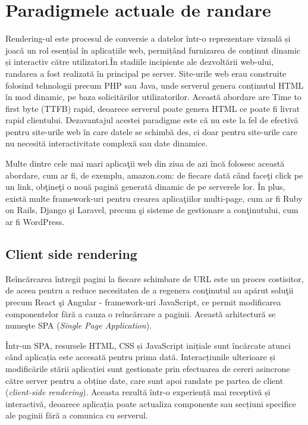 \documentclass[12pt, a4paper]{report}
\begin{document}
\chapter{Paradigmele actuale de randare}
Rendering-ul este procesul de conversie a datelor într-o reprezentare vizuală și joacă un rol esențial în aplicațiile web, permițând furnizarea de conținut dinamic și interactiv către utilizatori.În stadiile incipiente ale dezvoltării web-ului, randarea a fost realizată în principal pe server. Site-urile web erau construite folosind tehnologii precum PHP sau Java, unde serverul genera conținutul HTML în mod dinamic, pe baza solicitărilor utilizatorilor. Această abordare are Time to first byte (TTFB) rapid, deoarece serverul poate genera HTML ce poate fi livrat rapid clientului. Dezavantajul acestei paradigme este c\u a nu este la fel de efectivă pentru site-urile web \^ in care datele se schimb\u a des, ci doar pentru site-urile care nu necesit\u a interactivitate complexă sau date dinamice. \cite{benefitsserverrendering}

Multe dintre cele mai mari aplica\c tii web din ziua de azi \^ inc\u a folosesc aceast\u a abordare, cum ar fi, de exemplu, amazon.com: de fiecare dat\u a c\^ and face\c ti click pe un link, ob\c tine\c ti o nou\u a pagin\u a generat\u a dinamic de pe serverele lor. \^ In plus, exist\u a multe framework-uri pentru crearea  aplica\c tiilor multi-page, cum ar fi Ruby on Rails, Django \c si Laravel, precum \c si sisteme de gestionare a con\c tinutului, cum ar fi WordPress. 

\section{Client side rendering}

Re\^ inc\u arcarea \^ intregii pagini la fiecare schimbare de URL este un proces costisitor, de aceea pentru a reduce necesitatea de a regenera con\c tinutul au ap\u arut solu\c tii precum React \c si Angular - framework-uri JavaScript, ce permit modificarea componentelor f\u ar\u a a cauza o re\^ inc\u arcare a paginii. Aceast\u a arhitectur\u a se nume\c ste SPA (\textit{Single Page Application}).

Într-un SPA, resursele HTML, CSS și JavaScript inițiale sunt încărcate atunci când aplicația este accesată pentru prima dată. Interacțiunile ulterioare și modificările stării aplicației sunt gestionate prin efectuarea de cereri asincrone către server pentru a obține date, care sunt apoi randate pe partea de client (\textit{client-side rendering}). Aceasta rezultă \^intr-o experiență mai receptivă și interactivă, deoarece aplicația poate actualiza componente sau secțiuni specifice ale paginii fără a comunica cu serverul.
\end{document}
